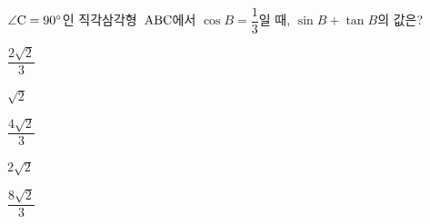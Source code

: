 $\angle\mathrm{C}=90^\circ$인 직각삼각형~$\mathrm{ABC}$에서 $\cos B=\dfrac{1}{3}$일 때, $\sin B+\tan B$의 값은?
\begin{choices32}{\rule[-3ex]{0pt}{8ex}$\dfrac{2\sqrt{2}}{3}$}{\rule[-3ex]{0pt}{8ex}$\sqrt{2}$}{\rule[-3ex]{0pt}{8ex}$\dfrac{4\sqrt{2}}{3}$}{\rule[-3ex]{0pt}{8ex}$2\sqrt{2}$}{\rule[-3ex]{0pt}{8ex}$\dfrac{8\sqrt{2}}{3}$}\end{choices32}
